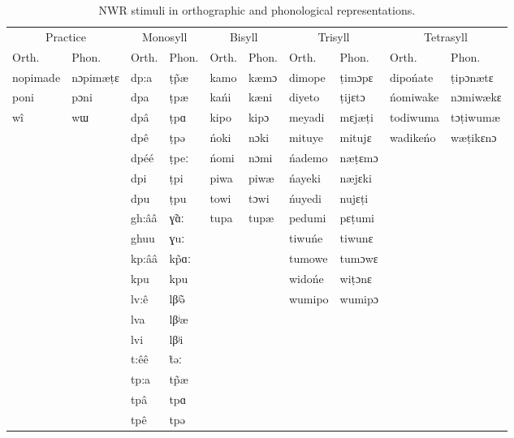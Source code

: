 \documentclass[english,,man,floatsintext]{apa6}
\begin{document}
\begin{table}

\caption{\label{tab:tab2-stims}NWR stimuli in orthographic and phonological representations.}
\centering
\begin{tabular}[t]{llllllllll}
\toprule
\multicolumn{2}{c}{Practice} & \multicolumn{2}{c}{Monosyll} & \multicolumn{2}{c}{Bisyll} & \multicolumn{2}{c}{Trisyll} & \multicolumn{2}{c}{Tetrasyll} \\
\cmidrule(l{3pt}r{3pt}){1-2} \cmidrule(l{3pt}r{3pt}){3-4} \cmidrule(l{3pt}r{3pt}){5-6} \cmidrule(l{3pt}r{3pt}){7-8} \cmidrule(l{3pt}r{3pt}){9-10}
Orth. & Phon. & Orth. & Phon. & Orth. & Phon. & Orth. & Phon. & Orth. & Phon.\\
\midrule
nopimade & nɔpimæṭɛ & dp:a & ṭp̃æ & kamo & kæmɔ & dimope & ṭimɔpɛ & dipońate & ṭipɔnætɛ\\
poni & pɔni & dpa & ṭpæ & kańi & kæni & diyeto & ṭijɛtɔ & ńomiwake & nɔmiwækɛ\\
wî & wɯ & dpâ & ṭpɑ & kipo & kipɔ & meyadi & mɛjæṭi & todiwuma & tɔṭiwumæ\\
 &  & dpê & ṭpə & ńoki & nɔki & mituye & mitujɛ & wadikeńo & wæṭikɛnɔ\\
 &  & dpéé & ṭpeː & ńomi & nɔmi & ńademo & næṭɛmɔ &  & \\
\addlinespace
 &  & dpi & ṭpi & piwa & piwæ & ńayeki & næjɛki &  & \\
 &  & dpu & ṭpu & towi & tɔwi & ńuyedi & nujɛṭi &  & \\
 &  & gh:ââ & ɣ̃ɑː & tupa & tupæ & pedumi & pɛṭumi &  & \\
 &  & ghuu & ɣuː &  &  & tiwuńe & tiwunɛ &  & \\
 &  & kp:ââ & kp̃ɑː &  &  & tumowe & tumɔwɛ &  & \\
\addlinespace
 &  & kpu & kpu &  &  & widońe & wiṭɔnɛ &  & \\
 &  & lv:ê & lβʲ̃ə &  &  & wumipo & wumipɔ &  & \\
 &  & lva & lβʲæ &  &  &  &  &  & \\
 &  & lvi & lβʲi &  &  &  &  &  & \\
 &  & t:êê & t̃əː &  &  &  &  &  & \\
\addlinespace
 &  & tp:a & tp̃æ &  &  &  &  &  & \\
 &  & tpâ & tpɑ &  &  &  &  &  & \\
 &  & tpê & tpə &  &  &  &  &  & \\
\bottomrule
\end{tabular}
\end{table}
\end{document}
